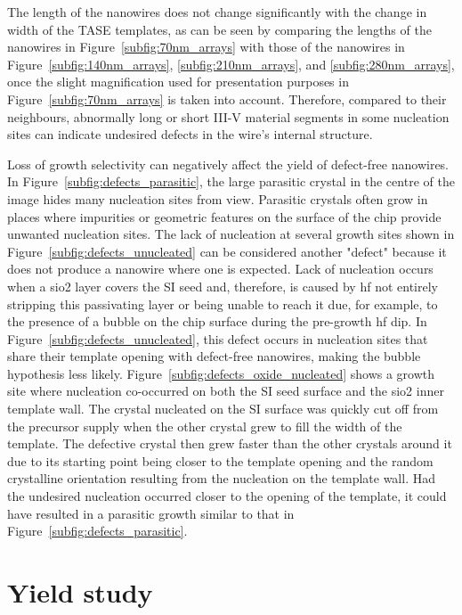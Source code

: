 The length of the nanowires does not change significantly with the change in width of the \acs{TASE} templates, as can be seen by comparing the lengths of the nanowires in Figure~\ref{subfig:70nm_arrays} with those of the nanowires in Figure~\ref{subfig:140nm_arrays}, \ref{subfig:210nm_arrays}, and \ref{subfig:280nm_arrays}, once the slight magnification used for presentation purposes in Figure~\ref{subfig:70nm_arrays} is taken into account. Therefore, compared to their neighbours, abnormally long or short III-V material segments in some nucleation sites can indicate undesired defects in the wire's internal structure.

Loss of growth selectivity can negatively affect the yield of defect-free nanowires. In Figure~\ref{subfig:defects_parasitic}, the large parasitic crystal in the centre of the image hides many nucleation sites from view. Parasitic crystals often grow in places where impurities or geometric features on the surface of the chip provide unwanted nucleation sites. The lack of nucleation at several growth sites shown in Figure~\ref{subfig:defects_unucleated} can be considered another "defect" because it does not produce a nanowire where one is expected. Lack of nucleation occurs when a \acs{sio2} layer covers the \acl{SI} seed and, therefore, is caused by \acf{hf} not entirely stripping this passivating layer or being unable to reach it due, for example, to the presence of a bubble on the chip surface during the pre-growth \acs{hf} dip. In Figure~\ref{subfig:defects_unucleated}, this defect occurs in nucleation sites that share their template opening with defect-free nanowires, making the bubble hypothesis less likely. Figure~\ref{subfig:defects_oxide_nucleated} shows a growth site where nucleation co-occurred on both the \acl{SI} seed surface and the \acs{sio2} inner template wall. The crystal nucleated on the \acl{SI} surface was quickly cut off from the precursor supply when the other crystal grew to fill the width of the template. The defective crystal then grew faster than the other crystals around it due to its starting point being closer to the template opening and the random crystalline orientation resulting from the nucleation on the template wall. Had the undesired nucleation occurred closer to the opening of the template, it could have resulted in a parasitic growth similar to that in Figure~\ref{subfig:defects_parasitic}.

\section{Yield study}

